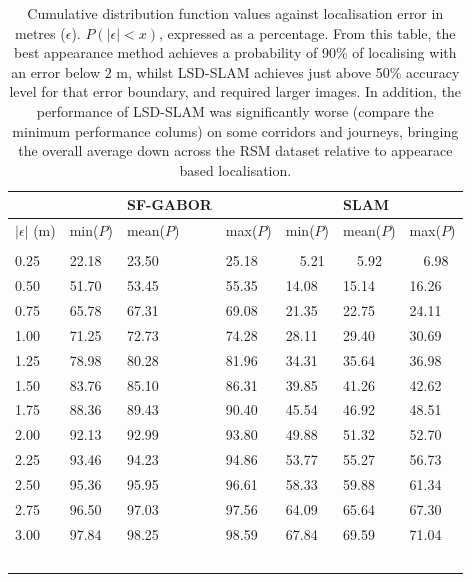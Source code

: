 \begin{table}
\caption{Cumulative distribution function values against localisation error in metres ($\epsilon$). $P(|\epsilon| < x)$, expressed as a percentage. From this table, the best appearance method achieves a probability of 90\% of localising with an error below $2$ m, whilst LSD-SLAM achieves just above 50\% accuracy level for that error boundary, and required larger images. In addition, the performance of LSD-SLAM was significantly worse (compare the minimum performance colums) on some corridors and journeys, bringing the overall average down across the RSM dataset relative to appearace based localisation.}
\label{tbl:cdftable}
\centering
    \begin{tabular}{llC{2.2cm}L{2.5cm}lll}
    \hline
    ~ & ~  & SF-GABOR & ~     & ~     & SLAM & ~     \\ \hline
    $|\epsilon|$ (m) & min($P$)  & mean($P$)   & max($P$)   & min($P$)   & mean($P$)     & max($P$)   \\ \hline \\ 
     0.25 & 22.18 & 23.50  & 25.18 & ~~5.21  & ~~5.92  & ~~6.98  \\
    0.50   & 51.70  & 53.45 & 55.35 & 14.08 & 15.14 & 16.26 \\
    0.75  & 65.78 & 67.31 & 69.08 & 21.35 & 22.75 & 24.11 \\
    1.00     & 71.25 & 72.73 & 74.28 & 28.11 & 29.40  & 30.69 \\
    1.25  & 78.98 & 80.28 & 81.96 & 34.31 & 35.64 & 36.98 \\
    1.50   & 83.76 & 85.10  & 86.31 & 39.85 & 41.26 & 42.62 \\
    1.75  & 88.36 & 89.43 & 90.40  & 45.54 & 46.92 & 48.51 \\
    2.00     & 92.13 & 92.99 & 93.80  & 49.88 & 51.32 & 52.70  \\
    2.25  & 93.46 & 94.23 & 94.86 & 53.77 & 55.27 & 56.73 \\
    2.50   & 95.36 & 95.95 & 96.61 & 58.33 & 59.88 & 61.34 \\
    2.75  & 96.50  &  97.03 &   97.56   & 64.09   & 65.64   &   67.30 \\
    3.00   &  97.84 &   98.25  &   98.59 &   67.84 &   69.59  &   71.04\\
    ~     & ~     & ~     & ~     & ~     & ~     & ~     \\
    \hline
    \end{tabular}
\end{table}



